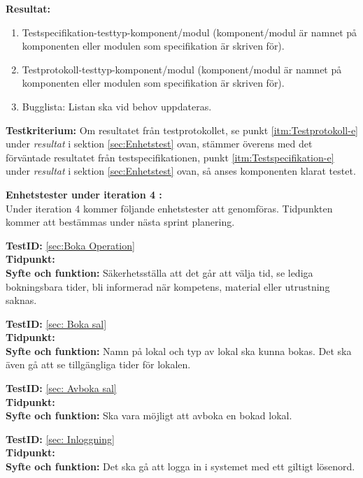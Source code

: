 \documentclass[a4paper,10pt, twoside]{article}
\begin{document}
\textbf{Resultat:}
\begin{enumerate}
	\item \label{itm:Testspecifikation-e} Testspecifikation-testtyp-komponent/modul (komponent/modul är namnet på 		   
	komponenten eller modulen som specifikation är skriven för).
    \item \label{itm:Testprotokoll-e} Testprotokoll-testtyp-komponent/modul (komponent/modul är namnet på komponenten 
    eller modulen som specifikation är skriven för).
    
    \item Bugglista: Listan ska vid behov uppdateras.
\end{enumerate}

\textbf{Testkriterium:} Om resultatet från testprotokollet, se punkt \ref{itm:Testprotokoll-e} under \emph{resultat} i 	   
sektion \ref{sec:Enhetstest} ovan, stämmer överens med det förväntade resultatet från testspecifikationen, punkt 
\ref{itm:Testspecifikation-e} under \emph{resultat} i sektion \ref{sec:Enhetstest} ovan, så anses komponenten klarat 
testet.

\textbf{Enhetstester under iteration 4 :} 
\\ Under iteration 4 kommer följande enhetstester att genomföras. Tidpunkten kommer att bestämmas under nästa 
sprint planering.

\textbf{TestID:} \ref{sec:Boka Operation}
\\ \textbf{Tidpunkt:}
\\ \textbf{Syfte och funktion:} Säkerhetsställa att det går att välja tid, se lediga bokningsbara tider, bli informerad 
när kompetens, material eller utrustning saknas.
  
\textbf{TestID:} \ref{sec: Boka sal} 
\\ \textbf{Tidpunkt:}
\\ \textbf{Syfte och funktion:} Namn på lokal och typ av lokal ska kunna bokas. Det ska även gå att se tillgängliga tider 
för lokalen.

\textbf{TestID:} \ref{sec: Avboka sal}
\\ \textbf{Tidpunkt:}
\\ \textbf{Syfte och funktion:} Ska vara möjligt att avboka en bokad lokal.
  
\textbf{TestID:} \ref{sec: Inloggning}
\\ \textbf{Tidpunkt:}  
\\ \textbf{Syfte och funktion:} Det ska gå att logga in i systemet med ett giltigt lösenord.
  
\end{document}

